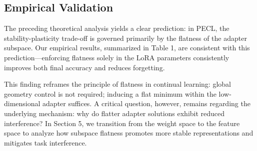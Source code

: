 \documentclass{article} %
\newtheorem{lemma}{Lemma}
\begin{document}
\subsection{ Empirical Validation}


The preceding theoretical analysis yields a clear prediction: in PECL, the stability-plasticity trade-off is governed primarily by the flatness of the adapter subspace. Our empirical results, summarized in Table 1, are consistent with this prediction—enforcing flatness solely in the LoRA parameters consistently improves both final accuracy and reduces forgetting.

This finding reframes the principle of flatness in continual learning: global geometry control is not required; inducing a flat minimum within the low-dimensional adapter suffices. A critical question, however, remains regarding the underlying mechanism: why do flatter adapter solutions exhibit reduced interference? In Section 5, we transition from the weight space to the feature space to analyze how subspace flatness promotes more stable representations and mitigates task interference.







 

\end{document}
